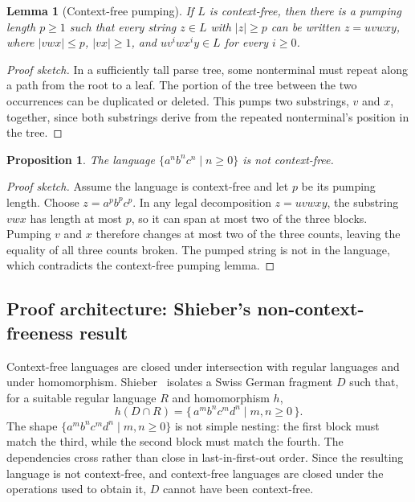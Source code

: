 \documentclass[11pt]{article}
\theoremstyle{definition}
\theoremstyle{plain}
\newtheorem{lemma}[theorem]{Lemma}
\newtheorem{proposition}[theorem]{Proposition}
\theoremstyle{remark}
\begin{document}
\begin{lemma}[Context-free pumping]
If $L$ is context-free, then there is a pumping length $p \ge 1$ such that every
string $z \in L$ with $|z| \ge p$ can be written $z=uvwxy$, where $|vwx| \le p$,
$|vx| \ge 1$, and $uv^iwx^iy \in L$ for every $i \ge 0$.
\end{lemma}

\begin{proof}[Proof sketch]
In a sufficiently tall parse tree, some nonterminal must repeat along a path from
the root to a leaf. The portion of the tree between the two occurrences can be
duplicated or deleted. This pumps two substrings, $v$ and $x$, together, since both
substrings derive from the repeated nonterminal's position in the tree.
\end{proof}

\begin{proposition}
The language $\{a^n b^n c^n \mid n \ge 0\}$ is not context-free.
\end{proposition}

\begin{proof}[Proof sketch]
Assume the language is context-free and let $p$ be its pumping length. Choose
$z=a^p b^p c^p$. In any legal decomposition $z=uvwxy$, the substring $vwx$ has
length at most $p$, so it can span at most two of the three blocks. Pumping $v$
and $x$ therefore changes at most two of the three counts, leaving the equality
of all three counts broken. The pumped string is not in the language, which
contradicts the context-free pumping lemma.
\end{proof}

\subsection*{Proof architecture: Shieber's non-context-freeness result}

Context-free languages are closed under intersection with regular languages and
under homomorphism. Shieber~\cite{shieber1985cf} isolates a Swiss German fragment $D$
such that, for a suitable regular language $R$ and homomorphism $h$,
\[
  h(D \cap R) = \{\, a^m b^n c^m d^n \mid m,n \ge 0 \,\}.
\]
The shape $\{a^m b^n c^m d^n \mid m,n \ge 0\}$ is not simple nesting: the first
block must match the third, while the second block must match the fourth. The
dependencies cross rather than close in last-in-first-out order. Since the resulting
language is not context-free, and context-free languages are closed under the
operations used to obtain it, $D$ cannot have been context-free.
\end{document}
